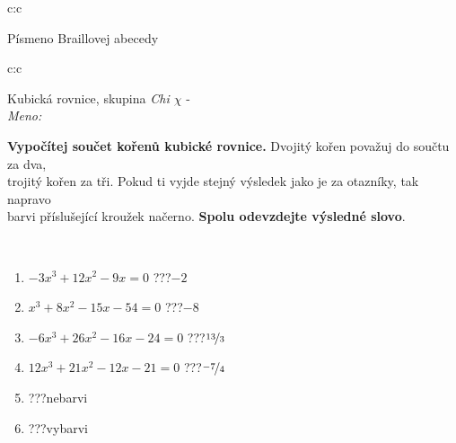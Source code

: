 \documentclass[10pt]{report}
\begin{document}
\begin{tabular}{c:c}
\begin{minipage}[c][104.5mm][t]{0.5\linewidth}
\begin{center}
\begin{minipage}{0.20\linewidth}
\begin{center}
{\small Písmeno Braillovej abecedy}
\end{center}
\end{minipage}
\end{center}
\end{minipage}
%
\end{tabular}
\newpage
\thispagestyle{empty}
\begin{tabular}{c:c}
\begin{minipage}[c][104.5mm][t]{0.5\linewidth}
\begin{center}
\vspace{7mm}
{\huge Kubická rovnice, skupina \textit{Chi $\chi$} -}\\[5mm]
\textit{Meno:}\phantom{xxxxxxxxxxxxxxxxxxxxxxxxxxxxxxxxxxxxxxxxxxxxxxxxxxxxxxxxxxxxxxxxx}\\[5mm]
\begin{minipage}{0.95\linewidth}
\textbf{Vypočítej součet kořenů kubické rovnice.} Dvojitý kořen považuj do součtu za dva,\\trojitý kořen za tři. Pokud ti vyjde stejný výsledek jako je za otazníky, tak napravo\\barvi příslušející kroužek načerno. \textbf{Spolu odevzdejte výsledné slovo}.
\end{minipage}
\\[1mm]
\begin{minipage}{0.79\linewidth}
\begin{center}
\begin{varwidth}{\linewidth}
\begin{enumerate}
\Large
\item $-3x^3+12x^2-9x=0$\quad \dotfill\; ???\;\dotfill \quad $-2$
\item $x^3+8x^2-15x-54=0$\quad \dotfill\; ???\;\dotfill \quad $-8$
\item $-6x^3+26x^2-16x-24=0$\quad \dotfill\; ???\;\dotfill \quad $\nicefrac{13}{3}$
\item $12x^3+21x^2-12x-21=0$\quad \dotfill\; ???\;\dotfill \quad $\nicefrac{-7}{4}$
\item \quad \dotfill\; ???\;\dotfill \quad nebarvi
\item \quad \dotfill\; ???\;\dotfill \quad vybarvi
\end{enumerate}
\end{varwidth}
\end{center}
\end{minipage}
\begin{minipage}{0.20\linewidth}
\begin{center}

\end{center}
\end{minipage}
\end{center}
\end{minipage}
\end{tabular}
\end{document}
